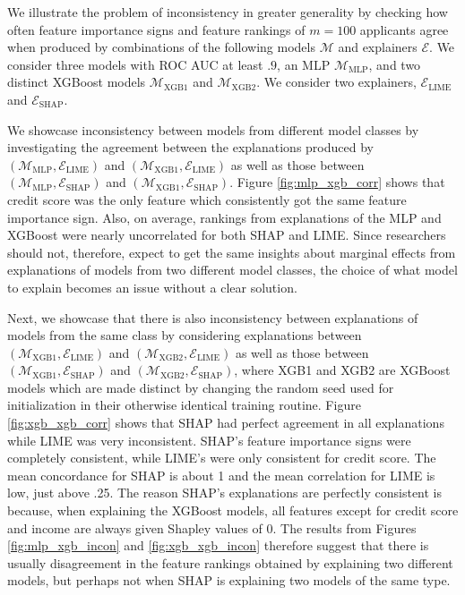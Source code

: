 \documentclass[mnsc,blindrev]{informs3}
\begin{document}
            We illustrate the problem of inconsistency in greater generality by checking how often  feature importance signs and feature rankings of $m=100$ applicants agree when produced by combinations of the following models $\mathcal{M}$ and explainers $\mathcal{E}$. We consider three models with ROC AUC at least $.9$, an MLP $\mathcal{M}_{\text{MLP}}$, and two distinct XGBoost models $\mathcal{M}_{\text{XGB1}}$ and $\mathcal{M}_{\text{XGB2}}$. We consider two explainers, $\mathcal{E}_{\text{LIME}}$ and $\mathcal{E}_{\text{SHAP}}$.
            
            
            We showcase inconsistency between models from different model classes by investigating the agreement between the explanations produced by $(\mathcal{M}_{\text{MLP}}, \mathcal{E}_{\text{LIME}})$ and $(\mathcal{M}_{\text{XGB1}}, \mathcal{E}_{\text{LIME}})$ as well as those between $(\mathcal{M}_{\text{MLP}}, \mathcal{E}_{\text{SHAP}})$ and $(\mathcal{M}_{\text{XGB1}}, \mathcal{E}_{\text{SHAP}})$. Figure \ref{fig:mlp_xgb_corr} shows that credit score was the only feature which consistently got the same feature importance sign. Also, on average, rankings from explanations of the MLP and XGBoost were nearly uncorrelated for both SHAP and LIME. Since researchers should not, therefore, expect to get the same insights about marginal effects from explanations of models from two different model classes, the choice of what model to explain becomes an issue without a clear solution.
            
            Next, we showcase that there is also inconsistency between explanations of models from the same class by considering explanations between   $(\mathcal{M}_{\text{XGB1}}, \mathcal{E}_{\text{LIME}})$ and $(\mathcal{M}_{\text{XGB2}}, \mathcal{E}_{\text{LIME}})$ as well as those between $(\mathcal{M}_{\text{XGB1}}, \mathcal{E}_{\text{SHAP}})$ and $(\mathcal{M}_{\text{XGB2}}, \mathcal{E}_{\text{SHAP}})$, where XGB1 and XGB2 are XGBoost models which are made distinct by changing the random seed used for initialization in their otherwise identical training routine. Figure \ref{fig:xgb_xgb_corr} shows that SHAP had perfect agreement in all explanations while LIME was very inconsistent. SHAP's feature importance signs were completely consistent, while LIME's were only consistent for credit score. The mean concordance for SHAP is about 1 and the mean correlation for LIME is low, just above .25. The reason SHAP's explanations are perfectly consistent is because, when explaining the XGBoost models, all features except for credit score and income are always given Shapley values of 0. 
            The results from Figures \ref{fig:mlp_xgb_incon} and \ref{fig:xgb_xgb_incon} therefore suggest that there is usually disagreement in the feature rankings obtained by explaining two different models, but perhaps not when SHAP is explaining two models of the same type. 
            
\end{document}
